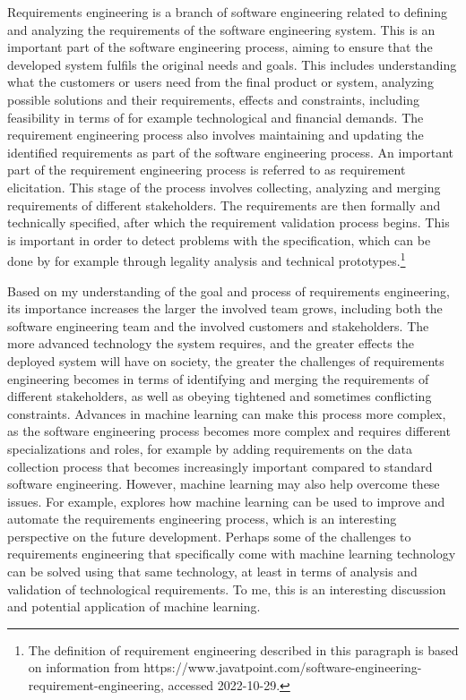 \documentclass{article}
\begin{document}
Requirements engineering is a branch of software engineering related to defining and analyzing the requirements of the software engineering system. This is an important part of the software engineering process, aiming to ensure that the developed system fulfils the original needs and goals. This includes understanding what the customers or users need from the final product or system, analyzing possible solutions and their requirements, effects and constraints, including feasibility in terms of for example technological and financial demands. The requirement engineering process also involves maintaining and updating the identified requirements as part of the software engineering process. An important part of the requirement engineering process is referred to as requirement elicitation. This stage of the process involves collecting, analyzing and merging requirements of different stakeholders. The requirements are then formally and technically specified, after which the requirement validation process begins. This is important in order to detect problems with the specification, which can be done by for example through legality analysis and technical prototypes.\footnote{The definition of requirement engineering described in this paragraph is based on information from https://www.javatpoint.com/software-engineering-requirement-engineering, accessed 2022-10-29.}  

Based on my understanding of the goal and process of requirements engineering, its importance increases the larger the involved team grows, including both the software engineering team and the involved customers and stakeholders. The more advanced technology the system requires, and the greater effects the deployed system will have on society, the greater the challenges of requirements engineering becomes in terms of identifying and merging the requirements of different stakeholders, as well as obeying tightened and sometimes conflicting constraints. Advances in machine learning can make this process more complex, as the software engineering process becomes more complex and requires different specializations and roles, for example by adding requirements on the data collection process that becomes increasingly important compared to standard software engineering. However, machine learning may also help overcome these issues. For example, \citet{requirements} explores how machine learning can be used to improve and automate the requirements engineering process, which is an interesting perspective on the future development. Perhaps some of the challenges to requirements engineering that specifically come with machine learning technology can be solved using that same technology, at least in terms of analysis and validation of technological requirements. To me, this is an interesting discussion and potential application of machine learning.
\end{document}
